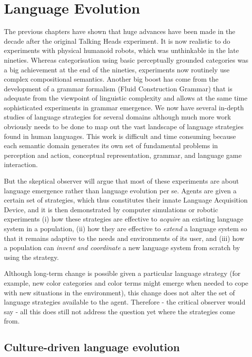 \chapter{Language Evolution}
\label{c:evolution}

The previous chapters have shown that huge advances have been made in the decade after the original Talking Heads experiment. 
It is now realistic to do experiments with physical humanoid robots, which was unthinkable 
in the late nineties. Whereas categorisation using 
basic perceptually grounded categories was a big achievement at the end of the nineties, experiments now routinely use 
complex compositional semantics. Another big boost has come from the development of a grammar formalism
(Fluid Construction Grammar) that is adequate from the viewpoint of linguistic complexity and allows at the same time
sophisticated experiments in grammar emergence. We now have several in-depth studies of language strategies for several 
domains although much more work obviously needs to be done to map out the vast landscape of language strategies found in 
human languages. This work is difficult and time consuming because each semantic domain generates its own set of fundamental 
problems in perception and action, conceptual representation, grammar, and language game interaction. 

But the skeptical observer will argue that most of these experiments are about language emergence rather than 
language evolution per se. Agents are given a certain set of strategies, which thus constitutes their 
innate Language Acquisition Device, and it is then demonstrated by computer simulations or 
robotic experiments (i) how these strategies are effective to {\itshape acquire} an existing language system in a 
population, (ii) how they are effective to {\itshape extend} a language system so that it remains adaptive 
to the needs and environments of its user, and (iii) how a population can {\itshape invent and coordinate} a new language system from 
scratch by using the strategy. 

Although long-term change is possible
given a particular language strategy (for example, new color categories and color terms might emerge
when needed to cope with new situations in the environment), this change does not alter
the set of language strategies available to the agent. Therefore - the critical observer would say - all this does still
not address the question yet where the strategies come from. 

\section{Culture-driven language evolution}

